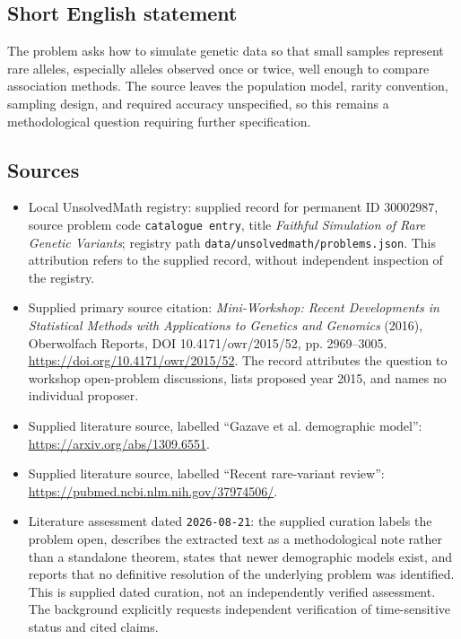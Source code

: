 \documentclass[11pt]{article}
\begin{document}
\subsection{Short English statement}
The problem asks how to simulate genetic data so that small samples represent rare alleles, especially alleles observed once or twice, well enough to compare association methods. The source leaves the population model, rarity convention, sampling design, and required accuracy unspecified, so this remains a methodological question requiring further specification.
\subsection{Sources}
\begin{itemize}
\item Local UnsolvedMath registry: supplied record for permanent ID \(30002987\), source problem code \texttt{catalogue entry}, title \emph{Faithful Simulation of Rare Genetic Variants}; registry path \texttt{data/unsolvedmath/problems.json}. This attribution refers to the supplied record, without independent inspection of the registry.
\item Supplied primary source citation: \emph{Mini-Workshop: Recent Developments in Statistical Methods with Applications to Genetics and Genomics} (2016), Oberwolfach Reports, DOI 10.4171/owr/2015/52, pp. 2969--3005. \url{https://doi.org/10.4171/owr/2015/52}. The record attributes the question to workshop open-problem discussions, lists proposed year 2015, and names no individual proposer.
\item Supplied literature source, labelled ``Gazave et al. demographic model'': \url{https://arxiv.org/abs/1309.6551}.
\item Supplied literature source, labelled ``Recent rare-variant review'': \url{https://pubmed.ncbi.nlm.nih.gov/37974506/}.
\item Literature assessment dated \texttt{2026-08-21}: the supplied curation labels the problem open, describes the extracted text as a methodological note rather than a standalone theorem, states that newer demographic models exist, and reports that no definitive resolution of the underlying problem was identified. This is supplied dated curation, not an independently verified assessment. The background explicitly requests independent verification of time-sensitive status and cited claims.
\end{itemize}
\end{document}
